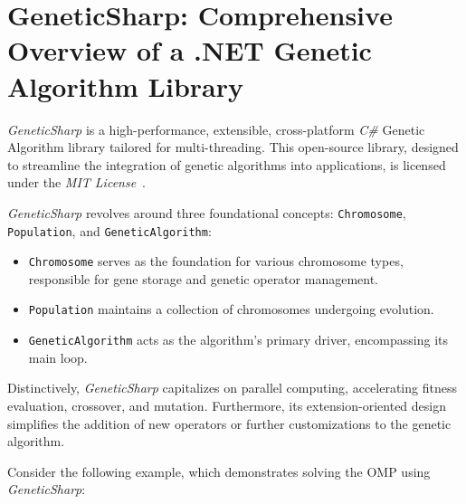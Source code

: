 \section{GeneticSharp: Comprehensive Overview of a .NET Genetic Algorithm Library}
\label{sec:sota:geneticsharp}
  \textit{GeneticSharp} is a high-performance, extensible, cross-platform 
  \textit{C\#} Genetic Algorithm library tailored for multi-threading.
  This open-source library, designed to streamline the integration of genetic algorithms into applications, is licensed under the 
  \textit{MIT License}~\autocite{MITLicense2006}.

  \textit{GeneticSharp} revolves around three foundational concepts: 
  \texttt{Chromosome}, 
  \texttt{Population}, and 
  \texttt{GeneticAlgorithm}:

  \begin{itemize}
    \item \texttt{Chromosome} serves as the foundation for various chromosome 
      types, responsible for gene storage and genetic operator management.
    \item \texttt{Population} maintains a collection of chromosomes undergoing 
      evolution.
    \item \texttt{GeneticAlgorithm} acts as the algorithm's primary driver, 
      encompassing its main loop.
  \end{itemize}

  Distinctively, \textit{GeneticSharp} capitalizes on parallel computing, 
  accelerating fitness evaluation, crossover, and mutation.
  Furthermore, its extension-oriented design simplifies the addition of new 
  operators or further customizations to the genetic algorithm.

  Consider the following example, which demonstrates solving the OMP using 
  \textit{GeneticSharp}:

